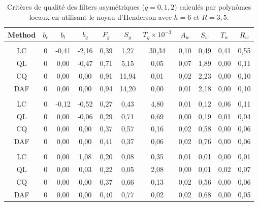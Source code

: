 \documentclass[
  12pt,
  a4paper,french]{article}
\newcommand\1{\mathds{1}}
\begin{document}
\begin{table}[!h]

\caption{\label{tab:criteriaLp}Critères de qualité des filters asymétriques ($q=0,1,2$) calculés par polynômes locaux en utilisant le noyau d'Henderson avec $h=6$ et $R=3,5$.}
\centering
\begin{tabular}[t]{ccccccccccc}
\toprule
Method & $b_c$ & $b_l$ & $b_q$ & $F_g$ & $S_g$ & $T_g \times 10^{-3}$ & $A_w$ & $S_w$ & $T_w$ & $R_w$\\
\midrule
\addlinespace[0.3em]
\multicolumn{11}{l}{\textbf{$q=0$}}\\
\hspace{1em}LC & 0 & -0,41 & -2,16 & 0,39 & 1,27 & 30,34 & 0,10 & 0,49 & 0,41 & 0,55\\
\hspace{1em}QL & 0 & 0,00 & -0,47 & 0,71 & 5,15 & 0,05 & 0,07 & 1,89 & 0,00 & 0,11\\
\hspace{1em}CQ & 0 & 0,00 & 0,00 & 0,91 & 11,94 & 0,01 & 0,02 & 2,23 & 0,00 & 0,10\\
\hspace{1em}DAF & 0 & 0,00 & 0,00 & 0,94 & 14,20 & 0,00 & 0,01 & 2,18 & 0,00 & 0,10\\
\addlinespace[0.3em]
\multicolumn{11}{l}{\textbf{$q=1$}}\\
\hspace{1em}LC & 0 & -0,12 & -0,52 & 0,27 & 0,43 & 4,80 & 0,01 & 0,12 & 0,06 & 0,11\\
\hspace{1em}QL & 0 & 0,00 & -0,06 & 0,29 & 0,71 & 0,69 & 0,00 & 0,19 & 0,01 & 0,04\\
\hspace{1em}CQ & 0 & 0,00 & 0,00 & 0,37 & 0,57 & 0,16 & 0,02 & 0,58 & 0,00 & 0,06\\
\hspace{1em}DAF & 0 & 0,00 & 0,00 & 0,41 & 0,37 & 0,06 & 0,02 & 0,76 & 0,00 & 0,06\\
\addlinespace[0.3em]
\multicolumn{11}{l}{\textbf{$q=2$}}\\
\hspace{1em}LC & 0 & 0,00 & 1,08 & 0,20 & 0,08 & 0,35 & 0,01 & 0,01 & 0,00 & 0,01\\
\hspace{1em}QL & 0 & 0,00 & 0,03 & 0,22 & 0,05 & 2,08 & 0,00 & 0,01 & 0,02 & 0,07\\
\hspace{1em}CQ & 0 & 0,00 & 0,00 & 0,37 & 0,66 & 0,13 & 0,02 & 0,56 & 0,00 & 0,06\\
\hspace{1em}DAF & 0 & 0,00 & 0,00 & 0,40 & 0,77 & 0,02 & 0,02 & 0,68 & 0,00 & 0,05\\
\bottomrule
\end{tabular}
\end{table}
\end{document}
